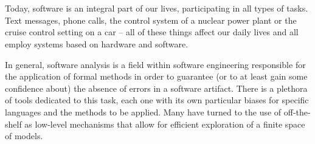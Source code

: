 
\chapter*{\runtitle}

Today, software is an integral part of our lives, participating in all types of tasks. Text messages, phone calls, the control system of a nuclear power plant or the cruise control setting on a car -- all of these things affect our daily lives and all employ systems based on hardware and software.

In general, software analysis is a field within software engineering responsible for the application of formal methods in order to guarantee (or to at least gain some confidence about) the absence of errors in a software artifact. There is a plethora of tools dedicated to this task, each one with its own particular biases for specific languages and the methods to be applied. Many have turned to the use of off-the-shelf \ssolvers as low-level mechanisms that allow for efficient exploration of a finite space of models.






 
